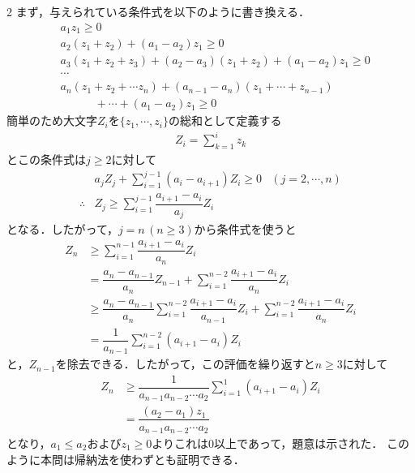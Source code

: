 \documentclass[../../main.tex]{subfiles}
\begin{document}
\begin{multicols}{2}
  まず，与えられている条件式を以下のように書き換える．
  \begin{align}
    & a_1 z_1 \ge 0                                                 \\
    & a_2(z_1+z_2) + (a_1-a_2) z_1 \ge 0                            \\
    & a_3 (z_1+z_2+z_3) + (a_2-a_3) (z_1+z_2) + (a_1-a_2) z_1 \ge 0 \\
    & \cdots                                                        \\
    & a_n (z_1+z_2+\cdots z_n) + (a_{n-1}-a_n) (z_1+\cdots+z_{n-1}) \\
    & \quad\quad\quad + \cdots + (a_1-a_2) z_1 \ge 0
  \end{align}
  簡単のため大文字$Z_i$を$\{z_1,\cdots,z_i\}$の総和として定義する
  \begin{align}
    Z_i = \sum_{k=1}^{i} z_k
  \end{align}
  とこの条件式は$j \ge 2$に対して
  \begin{align}
    & a_j Z_j + \sum_{i=1}^{j-1} (a_{i}-a_{i+1})Z_i \ge 0   & (j=2,\cdots,n) \label{eq:11} \\
    \therefore
    & Z_j \ge \sum_{i=1}^{j-1} \dfrac{a_{i+1}-a_{i}}{a_j}Z_i
  \end{align}
  となる．したがって，$j=n\, (n \ge 3)$から条件式を使うと
  \begin{align}
    Z_n
    & \ge \sum_{i=1}^{n-1} \dfrac{a_{i+1}-a_{i}}{a_n}Z_i                                                                              \\
    & = \dfrac{a_{n}-a_{n-1}}{a_n}Z_{n-1} + \sum_{i=1}^{n-2} \dfrac{a_{i+1}-a_{i}}{a_n}Z_i                                             \\
    & \ge \dfrac{a_{n}-a_{n-1}}{a_n}\sum_{i=1}^{n-2} \dfrac{a_{i+1}-a_{i}}{a_{n-1}}Z_i + \sum_{i=1}^{n-2} \dfrac{a_{i+1}-a_{i}}{a_n}Z_i \\
    & =  \dfrac{1}{a_{n-1}} \sum_{i=1}^{n-2}\left(a_{i+1}-a_{i}\right) Z_i
  \end{align}
  と，$Z_{n-1}$を除去できる．したがって，この評価を繰り返すと$n\ge 3$に対して
  \begin{align}
    Z_n
    & \ge \dfrac{1}{a_{n-1}a_{n-2}\cdots a_2}  \sum_{i=1}^{1}\left(a_{i+1}-a_{i}\right) Z_i \\
    & =\dfrac{(a_2-a_1)z_1}{a_{n-1}a_{n-2}\cdots a_2}
  \end{align}
  となり，$a_1 \le a_2$および$z_1 \ge 0$よりこれは$0$以上であって，題意は示された．
  このように本問は帰納法を使わずとも証明できる．


\end{multicols}
\end{document}
